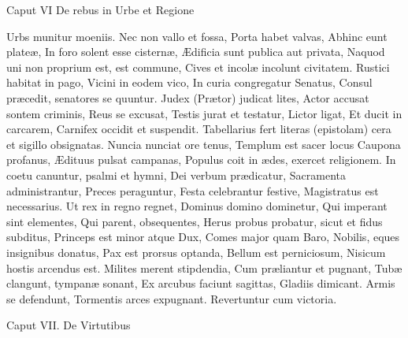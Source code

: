 Caput VI
De rebus in Urbe et Regione

Urbs munitur moeniis.
Nec non vallo et fossa,
Porta habet valvas,
Abhinc eunt plateæ,
In foro solent esse cisternæ,
Ædificia sunt publica aut privata,
Naquod uni non proprium est, est commune,
Cives et incolæ incolunt civitatem.
Rustici habitat in pago,
Vicini in eodem vico,
In curia congregatur Senatus,
Consul præcedit, senatores se quuntur.
Judex (Prætor) judicat lites,
Actor accusat sontem criminis,
Reus se excusat,
Testis jurat et testatur,
Lictor ligat,
Et ducit in carcarem,
Carnifex occidit et suspendit.
Tabellarius fert literas (epistolam) cera et sigillo obsignatas.
Nuncia nunciat ore tenus,
Templum est sacer locus
Caupona profanus,
Ædituus pulsat campanas,
Populus coit in ædes, exercet religionem.
In coetu canuntur, psalmi et hymni,
Dei verbum prædicatur,
Sacramenta administrantur,
Preces peraguntur,
Festa celebrantur festive,
Magistratus est necessarius.
Ut rex in regno regnet,
Dominus domino dominetur,
Qui imperant sint elementes,
Qui parent, obsequentes,
Herus probus probatur, sicut et fidus subditus,
Princeps est minor atque Dux,
Comes major quam Baro,
Nobilis, eques insignibus donatus,
Pax est prorsus optanda,
Bellum est perniciosum,
Nisicum hostis arcendus est.
Milites merent stipdendia,
Cum præliantur et pugnant,
Tubæ clangunt, tympanæ sonant,
Ex arcubus faciunt sagittas,
Gladiis dimicant.
Armis se defendunt,
Tormentis arces expugnant.
Revertuntur cum victoria.

Caput VII.
De Virtutibus

